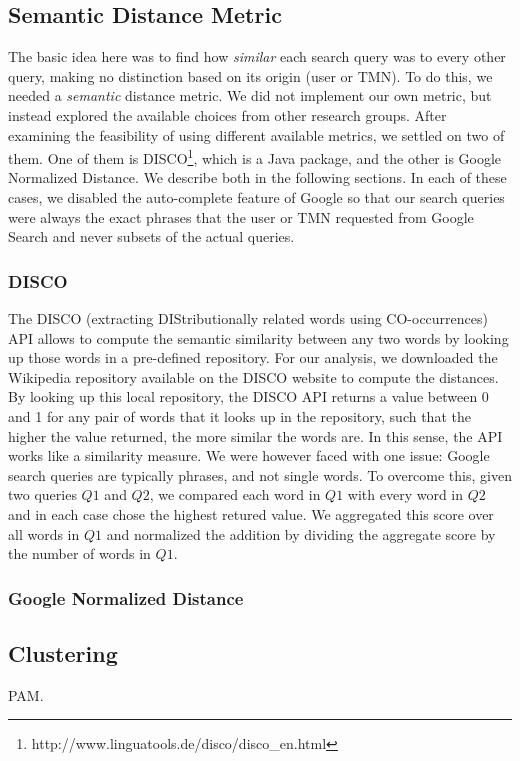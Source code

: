 \documentclass[11pt]{article}
\begin{document}
\begin{multicols}{2}
\subsection{Semantic Distance Metric}
The basic idea here was to find how \textit{similar} each search query was to every other query, making no distinction based on its origin (user or TMN). To do this, we needed a \textit{semantic} distance metric. We did not implement our own metric, but instead explored the available choices from other research groups. After examining the feasibility of using different available metrics, we settled on two of them. One of them is DISCO\footnote{http://www.linguatools.de/disco/disco\_en.html}, which is a Java package, and the other is Google Normalized Distance. We describe both in the following sections. In each of these cases, we disabled the auto-complete feature of Google so that our search queries were always the exact phrases that the user or TMN requested from Google Search and never subsets of the actual queries.

\subsubsection{DISCO}
The DISCO (extracting DIStributionally related words using CO-occurrences) API allows to compute the semantic similarity between any two words by looking up those words in a pre-defined repository. For our analysis, we downloaded the Wikipedia repository available on the DISCO website to compute the distances. By looking up this local repository, the DISCO API returns a value between 0 and 1 for any pair of words that it looks up in the repository, such that the higher the value returned, the more similar the words are. In this sense, the API works like a similarity measure. We were however faced with one issue: Google search queries are typically phrases, and not single words. To overcome this, given two queries $Q1$ and $Q2$, we compared each word in $Q1$ with every word in $Q2$ and in each case chose the highest retured value. We aggregated this score over all words in $Q1$ and normalized the addition by dividing the aggregate score by the number of words in $Q1$.

\subsubsection{Google Normalized Distance}

\subsection{Clustering}
\label{sec:clustering}
PAM.


\end{multicols}
\end{document}
